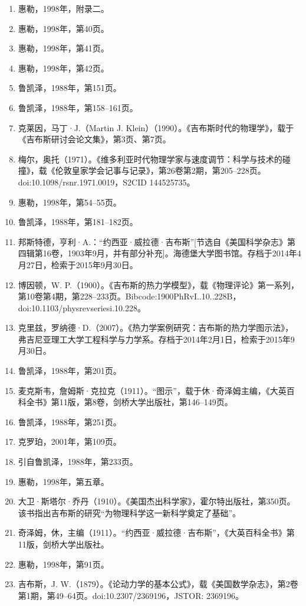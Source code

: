 \begin{enumerate}
\item 惠勒，1998年，附录二。
\item 惠勒，1998年，第40页。
\item 惠勒，1998年，第41页。
\item 惠勒，1998年，第42页。
\item 鲁凯泽，1988年，第151页。
\item 鲁凯泽，1988年，第158–161页。
\item 克莱因，马丁·J.（Martin J. Klein）（1990）。《吉布斯时代的物理学》，载于《吉布斯研讨会论文集》，第3页、第7页。
\item 梅尔，奥托（1971）。《维多利亚时代物理学家与速度调节：科学与技术的碰撞》，载《伦敦皇家学会记事与记录》，第26卷第2期，第205–228页。doi:10.1098/rsnr.1971.0019，S2CID 144525735。
\item 惠勒，1998年，第54–55页。
\item 鲁凯泽，1988年，第181–182页。
\item 邦斯特德，亨利·A.：“约西亚·威拉德·吉布斯”[节选自《美国科学杂志》第四辑第16卷，1903年9月，并有部分补充]。海德堡大学图书馆。存档于2014年4月27日，检索于2015年9月30日。
\item 博因顿，W. P.（1900）。《吉布斯的热力学模型》，载《物理评论》第一系列，第10卷第4期，第228–233页。Bibcode:1900PhRvI..10..228B，doi:10.1103/physrevseriesi.10.228。
\item 克里兹，罗纳德·D.（2007）。《热力学案例研究：吉布斯的热力学图示法》，弗吉尼亚理工大学工程科学与力学系。存档于2014年2月1日，检索于2015年9月30日。
\item 鲁凯泽，1988年，第201页。
\item 麦克斯韦，詹姆斯·克拉克（1911）。“图示”，载于休·奇泽姆主编，《大英百科全书》第11版，第8卷，剑桥大学出版社，第146–149页。
\item 鲁凯泽，1988年，第251页。
\item 克罗珀，2001年，第109页。
\item 引自鲁凯泽，1988年，第233页。
\item 惠勒，1998年，第五章。
\item 大卫·斯塔尔·乔丹（1910）。《美国杰出科学家》，霍尔特出版社，第350页。该书指出吉布斯的研究“为物理科学这一新科学奠定了基础”。
\item 奇泽姆，休，主编（1911）。“约西亚·威拉德·吉布斯”，《大英百科全书》第11版，剑桥大学出版社。
\item 惠勒，1998年，第91页。
\item 吉布斯，J. W.（1879）。《论动力学的基本公式》，载《美国数学杂志》，第2卷第1期，第49–64页。doi:10.2307/2369196，JSTOR: 2369196。

\end{enumerate}
